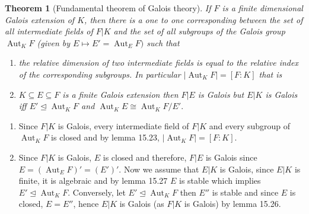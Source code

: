 \documentclass[11pt]{amsart}
\newtheorem{theorem}{Theorem}[section]
\DeclareMathOperator{\aut}{\text{Aut}}
\DeclareMathOperator{\id}{\text{id}}
\begin{document}
\begin{theorem}[Fundamental theorem of Galois theory]
If $F$ is a finite dimensional Galois extension of $K$, then there is a one to one corresponding between the set of all intermediate fields of $F|K$ and the set of all subgroups of the Galois group $\aut_KF$ (given by $E\mapsto E'=\aut_EF)$ such that \begin{enumerate}
\item the relative dimension of two intermediate fields is equal to the relative index of the corresponding subgroups. In particular $|\aut_KF|=[F:K]$ that is 
\begin{center}
\end{center}

\item $K\subseteq E\subseteq F$ is a finite Galois extension then $F|E$ is Galois but $E|K$ is Galois iff $E'\unlhd \aut_KF$ and $\aut_KE\cong \aut_KF/E'.$
\end{enumerate}
\end{theorem}

\proof \begin{enumerate}
\item Since $F|K$ is Galois, every intermediate field of $F|K$ and every subgroup of $\aut_KF$ is closed and by lemma 15.23, $|\aut_KF|=[F:K].$
\item Since $F|K$ is Galois, $E$ is closed and therefore, $F|E$ is Galois since $E=(\aut_EF)'=(E')'.$ Now we assume that $E|K$ is Galois, since $E|K$ is finite, it is algebraic and by lemma 15.27 $E$ is stable which implies $E'\unlhd \aut_KF.$ Conversely, let $E'\unlhd \aut_KF$ then $E''$ is stable and since $E$ is closed, $E=E''$, hence $E|K$ is Galois (as $F|K$ is Galois) by lemma 15.26.
\end{enumerate}
\end{document}
